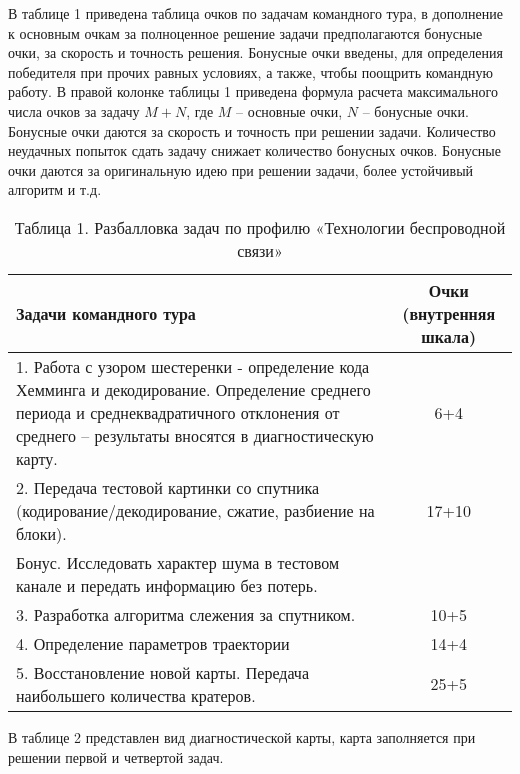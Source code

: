 \markSection

В таблице 1 приведена таблица очков по задачам командного тура, в дополнение к основным очкам за полноценное решение задачи предполагаются бонусные очки, за скорость и точность решения. Бонусные очки введены, для определения победителя при прочих равных условиях, а также, чтобы поощрить командную работу. В правой колонке таблицы 1 приведена формула расчета максимального числа очков за задачу $M+N$, где $M$ – основные очки, $N$ – бонусные очки. Бонусные очки даются за скорость и точность при решении задачи. Количество неудачных попыток сдать задачу снижает количество бонусных очков. Бонусные очки даются за оригинальную идею при решении задачи, более устойчивый алгоритм и т.д.

\begin{table}[H]
    \center
    \caption{Таблица 1. Разбалловка задач по профилю «Технологии беспроводной связи»}
    \begin{tabular}{|p{10cm}|c|}
        \hline
        Задачи командного тура & Очки (внутренняя шкала) \\
        \hline
        1. Работа с узором шестеренки - определение кода Хемминга и декодирование. Определение среднего периода и среднеквадратичного отклонения от среднего – результаты вносятся в диагностическую карту.	& 6+4 \\
        \hline
        2. Передача тестовой картинки со спутника (кодирование/декодирование, сжатие, разбиение на блоки). & 17+10 \\
        Бонус. Исследовать характер шума в тестовом канале и передать информацию без потерь. & \\
        \hline
        3. Разработка алгоритма слежения за спутником.	&10+5 \\
        \hline
        4. Определение параметров траектории&14+4\\
        \hline
        5. Восстановление новой карты. Передача наибольшего количества кратеров.	&25+5\\
        \hline
    \end{tabular}
\end{table}

В таблице 2 представлен вид диагностической карты, карта заполняется при решении первой и четвертой задач.

